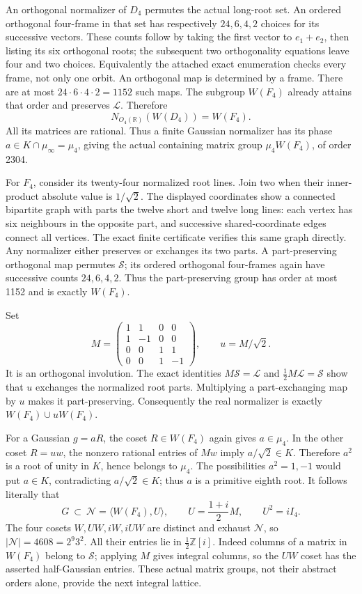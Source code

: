 An orthogonal normalizer of \(D_4\) permutes the actual long-root
set. An ordered orthogonal four-frame in that set has respectively
\(24,6,4,2\) choices for its successive vectors. These counts follow
by taking the first vector to \(e_1+e_2\), then listing its six
orthogonal roots; the subsequent two orthogonality equations leave
four and two choices. Equivalently the attached exact enumeration
checks every frame, not only one orbit. An orthogonal map is determined
by a frame. There are at most \(24\cdot6\cdot4\cdot2=1152\)
such maps. The subgroup \(W(F_4)\) already attains that order and
preserves \(\mathcal L\). Therefore
\[
               N_{O_4(\mathbb R)}(W(D_4))=W(F_4).            \tag{S35.3}
\]
All its matrices are rational. Thus a finite Gaussian normalizer
has its phase \(a\in K\cap\mu_\infty=\mu_4\), giving the
actual containing matrix group \(\mu_4W(F_4)\), of order 2304.

For \(F_4\), consider its twenty-four normalized root lines. Join
two when their inner-product absolute value is \(1/\sqrt2\).
The displayed coordinates show a connected bipartite graph with
parts the twelve short and twelve long lines: each vertex has six
neighbours in the opposite part, and successive shared-coordinate
edges connect all vertices. The exact finite certificate verifies
this same graph directly. Any normalizer either preserves or exchanges
its two parts. A part-preserving orthogonal map permutes
\(\mathcal S\); its ordered orthogonal four-frames again have
successive counts \(24,6,4,2\). Thus the part-preserving group
has order at most 1152 and is exactly \(W(F_4)\).

Set
\[
 M=\begin{pmatrix}1&1&0&0\\1&-1&0&0\\0&0&1&1\\0&0&1&-1\end{pmatrix},
 \qquad u=M/\sqrt2.
\]
It is an orthogonal involution. The exact identities
\(M\mathcal S=\mathcal L\) and
\(\tfrac12M\mathcal L=\mathcal S\) show that \(u\) exchanges
the normalized root parts. Multiplying a part-exchanging map by
\(u\) makes it part-preserving. Consequently the real normalizer
is exactly \(W(F_4)\cup uW(F_4)\).

For a Gaussian \(g=aR\), the coset \(R\in W(F_4)\) again gives
\(a\in\mu_4\). In the other coset \(R=uw\), the nonzero rational
entries of \(Mw\) imply \(a/\sqrt2\in K\). Therefore \(a^2\)
is a root of unity in \(K\), hence belongs to \(\mu_4\).
The possibilities \(a^2=1,-1\) would put \(a\in K\), contradicting
\(a/\sqrt2\in K\); thus \(a\) is a primitive eighth root.
It follows literally that
\[
 G\ \subset\ \mathcal N=\langle W(F_4),U\rangle,
 \qquad U=\frac{1+i}{2}M,\qquad U^2=iI_4.                  \tag{S35.4}
\]
The four cosets \(W,UW,iW,iUW\) are distinct and exhaust
\(\mathcal N\), so \(|\mathcal N|=4608=2^9 3^2\).
All their entries lie in \(\tfrac12\mathbb Z[i]\).
Indeed columns of a matrix in \(W(F_4)\) belong to \(\mathcal S\);
applying \(M\) gives integral columns, so the \(UW\) coset has
the asserted half-Gaussian entries. These actual matrix groups,
not their abstract orders alone, provide the next integral lattice.

